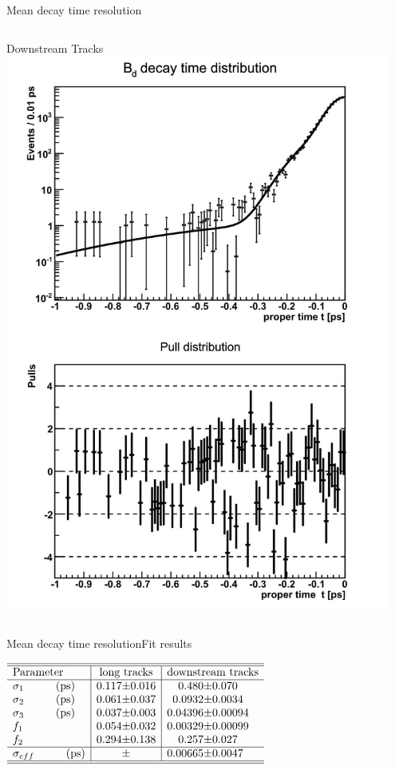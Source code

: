 \documentclass{beamer}
\begin{document}
\begin{frame}{Mean decay time resolution}
\begin{columns}
\begin{block}{Downstream Tracks}
	\includegraphics[width=0.95\textwidth]{resolution_ds}
	\end{block}
	\end{columns}
	\end{frame}

    \begin{frame}{Mean decay time resolution}{Fit results}
    \begin{center}
    $\begin{array}{l | r@{\pm}l | r@{\pm}l}
\hline 
\hline
\text{Parameter} & \multicolumn{2}{c|}{\text{long tracks}} & \multicolumn{2}{c}{\text{downstream tracks}}\\
\hline
\sigma_{1}\hspace{1cm}(\text{ps}) &	0.117 & 0.016 & 0.480 & 0.070\\
\sigma_{2}\hspace{1cm}(\text{ps}) &	0.061 & 0.037 & 0.0932 & 0.0034\\
\sigma_{3}\hspace{1cm}(\text{ps}) &0.037 &	0.003 & 0.04396 & 0.00094  \\
f_{1} & 0.054 & 0.032 & 0.00329 & 0.00099\\
f_{2} & 0.294 & 0.138 & 0.257 & 0.027\\ \hline 
\sigma_{eff}\hspace{1cm}(\text{ps}) & & & 0.00665 & 0.0047 \\ \hline \hline
\end{array}$   
    \end{center}
    \end{frame}        	
	
\end{document}
